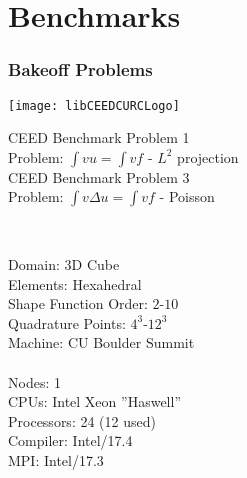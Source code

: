 \documentclass{beamer}
\begin{document}
\section{Benchmarks}

\begin{frame}
\begin{center}
\frametitle{Bakeoff Problems}

\texttt{[image: libCEEDCURCLogo]}

\begin{multicols}{2}

\hspace{2mm} CEED Benchmark Problem 1\\

Problem: $\int v u = \int v f$ - $L^2$ projection\\

\hspace{2mm} CEED Benchmark Problem 3\\

Problem: $\int v \Delta u = \int v f$ - Poisson\\

\end{multicols}

~\\

\begin{flushleft}

\begin{multicols}{2}

Domain: 3D Cube\\

Elements: Hexahedral\\

Shape Function Order: $2$-$10$\\

Quadrature Points: $4^3$-$12^3$\\

Machine: CU Boulder Summit\\

~\\

Nodes: 1\\

CPUs: Intel Xeon ''Haswell''\\

Processors: 24 (12 used)\\

Compiler: Intel/17.4\\

MPI: Intel/17.3\\

~\\

\end{multicols}

\end{flushleft}

\end{center}
\end{frame}
\end{document}
